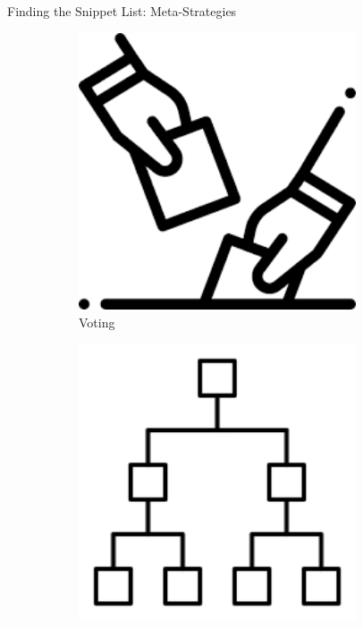 \documentclass{beamer}
\begin{document}
\begin{frame}{Finding the Snippet List: Meta-Strategies}
    \begin{figure}
        \centering
        \hspace*{0.5cm} 
        \begin{subfigure}[b]{0.25\textwidth}
            \centering
            \includegraphics[width=0.9\textwidth]{images/voting.png}
            \caption{Voting}
        \end{subfigure}
        \hfill
        \begin{subfigure}[b]{0.25\textwidth}
            \centering
            \includegraphics[width=0.9\textwidth]{images/tournament.png}

\end{subfigure}
\end{figure}
\end{frame}
\end{document}
